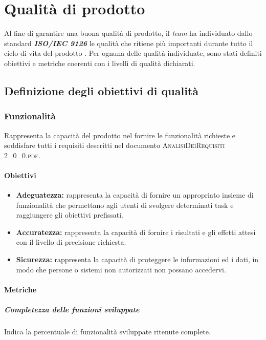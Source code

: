 \newpage
\section{Qualità di prodotto}
	
Al fine di garantire una buona qualità di prodotto, il \textit{team} ha individuato dallo standard \textbf{\textit{ISO/IEC 9126}} le qualità che ritiene più importanti durante tutto il ciclo di vita del prodotto \progetto. Per ognuna delle qualità individuate, sono stati definiti obiettivi e metriche coerenti con i livelli di qualità dichiarati.

\subsection{Definizione degli obiettivi di qualità}

	\subsubsection{Funzionalità}
	Rappresenta la capacità del prodotto nel fornire le funzionalità richieste e soddisfare tutti i requisiti descritti nel documento \textsc{AnalisiDeiRequisiti 2\_0\_0.pdf}.
		
		\paragraph{Obiettivi}
			\begin{itemize}
				\item \textbf{Adeguatezza:} rappresenta la capacità di fornire un appropriato insieme di funzionalità che permettano agli utenti di svolgere determinati task e raggiungere gli obiettivi prefissati.
				\item \textbf{Accuratezza:} rappresenta la capacità di fornire i risultati e gli effetti attesi con il livello di precisione richiesta.
				\item \textbf{Sicurezza:} rappresenta la capacità di proteggere le informazioni ed i dati, in modo che persone o sistemi non autorizzati non possano accedervi.
			\end{itemize}
		
		\paragraph{Metriche}
			\subparagraph{Completezza delle funzioni sviluppate}
			Indica la percentuale di funzionalità sviluppate ritenute complete.
			
